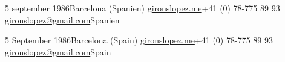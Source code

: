 
\ifswedish

        {5 september 1986}{Barcelona (Spanien)}
        {\href{http://gironslopez.me}{gironslopez.me}}{+41 (0) 78-775 89 93}
        {\href{mailto:gironslopez@gmail.com}{gironslopez@gmail.com}}{Spanien}

\else

        {5 September 1986}{Barcelona (Spain)}
        {\href{http://gironslopez.me}{gironslopez.me}}{+41 (0) 78-775 89 93}
        {\href{mailto:gironslopez@gmail.com}{gironslopez@gmail.com}}{Spain}

\fi
